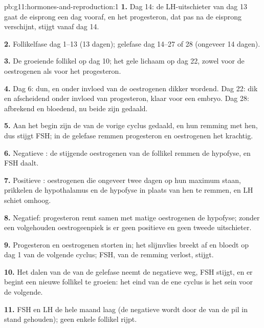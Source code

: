 \begin{solution}{pb:g11:hormones-and-reproduction:1}
\textbf{1.} Dag 14: de LH-uitschieter van dag 13 gaat de eisprong een dag
vooraf, en het progesteron, dat pas na de eisprong verschijnt, stijgt
vanaf dag 14.

\textbf{2.} Follikelfase dag 1--13 (13 dagen); gelefase dag 14--27 of 28
(ongeveer 14 dagen).

\textbf{3.} De groeiende follikel op dag 10; het gele lichaam op dag 22,
zowel voor de oestrogenen als voor het progesteron.

\textbf{4.} Dag 6: dun, en onder invloed van de oestrogenen dikker
wordend. Dag 22: dik en afscheidend onder invloed van progesteron, klaar
voor een embryo. Dag 28: afbrekend en bloedend, nu beide  zijn
gedaald.

\textbf{5.} Aan het begin zijn de  van de vorige cyclus gedaald,
en hun remming met hen, dus stijgt FSH; in de gelefase remmen progesteron
en oestrogenen het krachtig.

\textbf{6.} Negatieve : de stijgende oestrogenen van de
follikel remmen de hypofyse, en FSH daalt.

\textbf{7.} Positieve : oestrogenen die ongeveer twee dagen
op hun maximum staan, prikkelen de hypothalamus en de hypofyse in plaats
van hen te remmen, en LH schiet omhoog.

\textbf{8.} Negatief: progesteron remt samen met matige oestrogenen de
hypofyse; zonder een volgehouden oestrogeenpiek is er geen positieve
 en geen tweede uitschieter.

\textbf{9.} Progesteron en oestrogenen storten in; het slijmvlies breekt
af en bloedt op dag 1 van de volgende cyclus; FSH, van de remming
verlost, stijgt.

\textbf{10.} Het dalen van de  van de gelefase neemt de negatieve
 weg, FSH stijgt, en er begint een nieuwe follikel te
groeien: het eind van de ene cyclus is het sein voor de volgende.

\textbf{11.} FSH en LH de hele maand laag (de negatieve 
wordt door de  van de pil in stand gehouden); geen enkele
follikel rijpt.


\end{solution}
